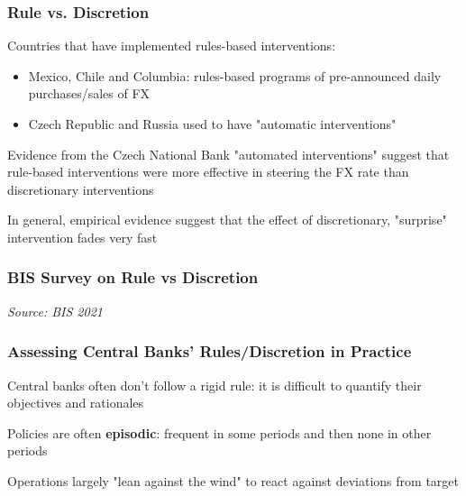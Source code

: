 \documentclass{beamer}
\newenvironment{wideitemize}{\itemize\addtolength{\itemsep}{10pt}}{\enditemize}
\begin{document}
\begin{frame}
  \frametitle{Rule vs. Discretion}

  \begin{wideitemize}

  \item Countries that have implemented rules-based interventions:
    \begin{itemize}
    \item Mexico, Chile and Columbia: rules-based programs of pre-announced daily purchases/sales of FX
    \item Czech Republic and Russia used to have "automatic interventions"
    \end{itemize}
  \item Evidence from the Czech National Bank \href{https://onlinelibrary.wiley.com/doi/10.1111/jmcb.12028}{} "automated interventions" suggest that rule-based interventions were more effective in steering the FX rate than discretionary interventions
  \item In general, empirical evidence suggest that the effect of discretionary, "surprise" intervention fades very fast    
  \end{wideitemize}  
\end{frame}


\begin{frame}
  \frametitle{BIS Survey on Rule vs Discretion}
  \medskip
  \emph{Source: BIS 2021 \href{https://www.bis.org/publ/mc_insights_fxinterventions.pdf}{}}
\end{frame}

\begin{frame}
  \frametitle{Assessing Central Banks' Rules/Discretion in Practice}
  \begin{wideitemize}
    \item Central banks often don't follow a rigid rule: it is difficult to quantify their objectives and rationales
    \item Policies are often \textbf{episodic}: frequent in some periods and then none in other periods
    \item Operations largely "lean against the wind" to react against deviations from target
  \end{wideitemize}  
\end{frame}
\end{document}
